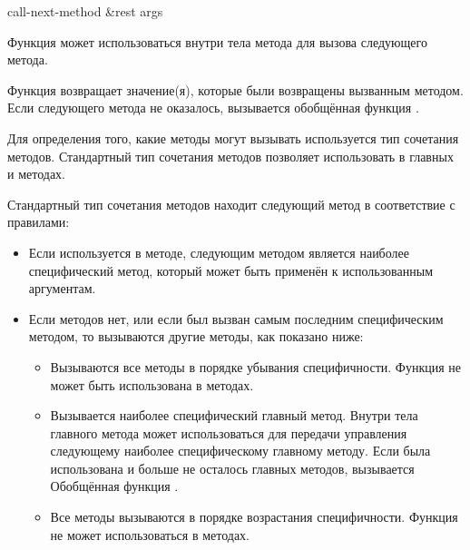 \begin{defun}[Функция]
call-next-method &rest args

Функция  может использоваться внутри тела метода для
вызова следующего метода.

Функция  возвращает значение(я), которые были возвращены
вызванным методом. Если следующего метода не оказалось, вызывается обобщённая
функция .

Для определения того, какие методы могут вызывать 
используется тип сочетания методов. Стандартный тип сочетания методов
позволяет использовать  в главных и  методах.

Стандартный тип сочетания методов находит следующий метод в соответствие с
правилами:

\begin{itemize}

\item
Если  используется в  методе, следующим
методом является наиболее специфический метод, который может быть применён к
использованным аргументам.

\item 
Если  методов нет, или если  был вызван
  самым последним специфическим  методом, то вызываются другие
  методы, как показано ниже:

\begin{itemize}

\item Вызываются все  методы в порядке убывания
  специфичности. Функция  не может быть использована в
   методах.

\item 
Вызывается наиболее специфический главный метод. Внутри тела главного
  метода может использоваться  для передачи управления
  следующему наиболее специфическому главному методу. Если была использована
   и больше не осталось главных методов, вызывается
  Обобщённая функция .

\item Все  методы вызываются в порядке возрастания
  специфичности. Функция  не может использоваться в
   методах.
\end{itemize}
\end{itemize}


\end{defun}
